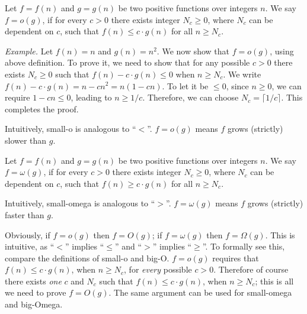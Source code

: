 

\begin{definition}[small-o]
Let $f = f(n)$ and $g=g(n)$ be two positive functions over integers $n$.
We say $f = o(g)$, if for every $c > 0$ there exists integer $N_c \ge 0$, where $N_c$ can be dependent on $c$,
such that $f(n) \le c\cdot g(n)$ for all $n\ge N_c$.
\end{definition}

\emph{Example.} Let $f(n) = n$ and $g(n) = n^2$. We now show that $f = o(g)$,
using above definition. 
To prove it, we need to show that for any possible $c>0$ there exists $N_c \ge 0$ such that $f(n) -c\cdot g(n) \le 0$ when $n \ge N_c$. 
We write $f(n) - c\cdot g(n) = n - cn^2 = n(1-cn)$. To let it be $\le 0$, since $n\ge 0$, we can require $1-cn \le 0$, leading to $n \ge 1/c$.
Therefore, we can choose $N_c = \lceil 1/c \rceil$. This completes the proof.

Intuitively, small-o is analogous to ``$<$''.
$f=o(g)$ means $f$ grows (strictly) slower than $g$.

\begin{definition}
Let $f = f(n)$ and $g=g(n)$ be two positive functions over integers $n$.
We say $f = \omega(g)$, if for every $c > 0$ there exists integer $N_c \ge 0$, where $N_c$ can be dependent on $c$,
such that $f(n) \ge c\cdot g(n)$ for all $n\ge N_c$.
\end{definition}

Intuitively, small-omega is analogous to ``$>$''.
$f=\omega(g)$ means $f$ grows (strictly) faster than $g$.

Obviously, if $f = o(g)$ then $f = O(g)$; if $f = \omega(g)$ then $f = \Omega(g)$.
This is intuitive, as ``$<$'' implies ``$\le$''
and ``$>$'' implies ``$\ge$''. To formally see this, compare the definitions of small-o and big-O.
$f = o(g)$ requires that $f(n) \le c\cdot g(n)$, when $n \ge N_c$, for \emph{every} possible $c>0$. Therefore of course there exists
\emph{one} $c$ and $N_c$ such that $f(n) \le c\cdot g(n)$, when $n \ge N_c$; this is all we need to prove $f = O(g)$. 
The same argument can be used for small-omega and big-Omega.

